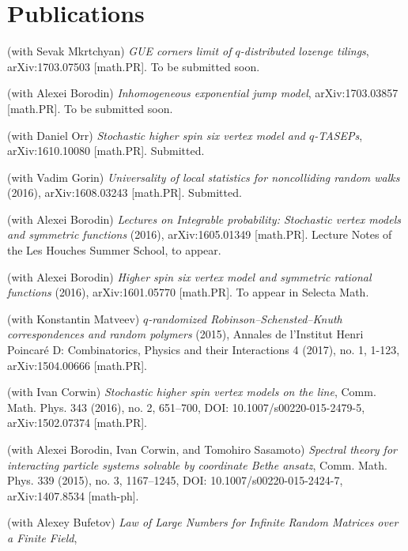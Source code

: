 \documentclass[letterpaper,11pt]{article}
\begin{document}
\section*{Publications}

\begin{etaremune}
    \renewcommand{\labelenumi}{[\theenumi]}
		\item (with Sevak Mkrtchyan)
			\emph{GUE corners limit of $q$-distributed lozenge tilings},
			arXiv:1703.07503 [math.PR]. To be submitted soon.
		\item (with Alexei Borodin)
			\emph{Inhomogeneous exponential jump model},
			arXiv:1703.03857 [math.PR]. To be submitted soon.
    \item (with Daniel Orr)
		\emph{Stochastic higher spin six vertex model and $q$-TASEPs}, arXiv:1610.10080 [math.PR]. Submitted.
    \item (with Vadim Gorin)
    \emph{Universality of local statistics for noncolliding random walks} (2016), 
		arXiv:1608.03243 [math.PR]. Submitted.
    \item (with Alexei Borodin) 
    \emph{Lectures on Integrable probability: Stochastic vertex models and symmetric functions}
    (2016), arXiv:1605.01349 [math.PR]. Lecture Notes of the Les Houches Summer School, to appear.
    \item (with Alexei Borodin)
    \emph{Higher spin six vertex model and symmetric rational functions}
    (2016),
    arXiv:1601.05770 [math.PR]. To appear in Selecta Math.
    \item (with Konstantin Matveev)
    \emph{$q$-randomized Robinson--Schensted--Knuth correspondences and random polymers}
    (2015),
    Annales de l'Institut Henri Poincar\'e D:
    Combinatorics, Physics and their Interactions
		4 (2017), no. 1, 1-123,
    arXiv:1504.00666 [math.PR]. 
    \item (with Ivan Corwin)
    \emph{Stochastic higher spin vertex models on the line},
    Comm. Math. Phys. 
    343 (2016), no. 2, 
    651--700,
    DOI: 10.1007/s00220-015-2479-5,
    arXiv:1502.07374 [math.PR].
    \item (with Alexei Borodin, Ivan Corwin, and Tomohiro Sasamoto)
    \emph{Spectral theory for interacting particle systems solvable by coordinate Bethe ansatz}, 
    Comm. Math. Phys.
    339 (2015), no. 3, 
    1167--1245,
    DOI: 10.1007/s00220-015-2424-7,
    arXiv:1407.8534 [math-ph].
    \item (with Alexey Bufetov)
    \emph{Law of Large Numbers for Infinite Random Matrices over a Finite Field}, 

\end{etaremune}
\end{document}
